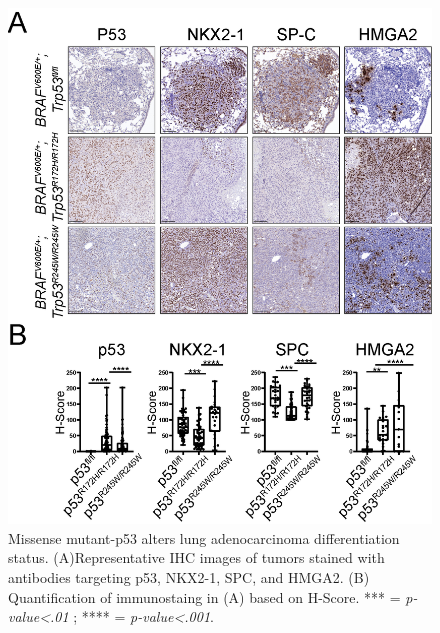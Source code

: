 \begin{figure}
\hypertarget{fig:04}{%
\centering
\includegraphics[width=1\textwidth,height=\textheight]{images/p53_4.png}
\caption{Missense mutant-p53 alters lung adenocarcinoma differentiation status. (A)Representative IHC images of tumors stained with antibodies targeting p53, NKX2-1, SPC, and HMGA2. (B) Quantification of immunostaing in (A) based on H-Score. *** = \emph{p-value\textless.01} ; **** = \emph{p-value\textless.001}.}\label{fig:04}
}
\end{figure}

